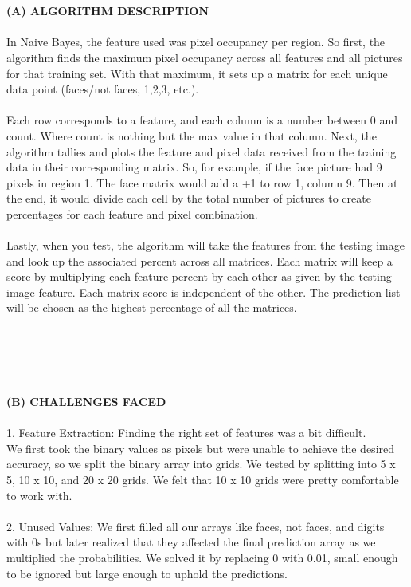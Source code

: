 \documentclass[10 pt]{report}   	%
\begin{document}
\large {\\ \\\textbf {(A) ALGORITHM DESCRIPTION} \\ \\
In Naive Bayes, the feature used was pixel occupancy per region. So first, the algorithm finds the maximum pixel occupancy across all features and all pictures for that training set. With that maximum, it sets up a matrix for each unique data point (faces/not faces, 1,2,3, etc.). \\ \\
Each row corresponds to a feature, and each column is a number between 0 and count. Where count is nothing but the max value in that column. Next, the algorithm tallies and plots the feature and pixel data received from the training data in their corresponding matrix. So, for example, if the face picture had 9 pixels in region 1. The face matrix would add a +1 to row 1, column 9. Then at the end, it would divide each cell by
the total number of pictures to create percentages for each feature and pixel combination.\\ \\
Lastly, when you test, the algorithm will take the features from the testing image and look up the associated percent across all matrices. Each matrix will keep a score by multiplying each feature percent by each other as given by the testing image feature. Each matrix score is independent of the other. The prediction list will be chosen as the highest percentage of all the matrices. \\ \\ \\ \\ \\ \\
\textbf{(B) CHALLENGES FACED} \\ \\ 
1. Feature Extraction: Finding the right set of features was a bit difficult. \\ We first took the binary values as pixels but were unable to achieve the desired accuracy, so we split the binary array into grids. We tested by splitting into 5 x 5, 10 x 10, and 20 x 20 grids. We felt that 10 x 10 grids were pretty comfortable to work with. \\ \\ 

2. Unused Values: We first filled all our arrays like faces, not faces, and digits with 0s but later realized that they affected the final prediction array as we multiplied the probabilities. We solved it by replacing 0 with 0.01, small enough to be ignored but large enough to uphold the predictions. \\ 

}
\end{document}
